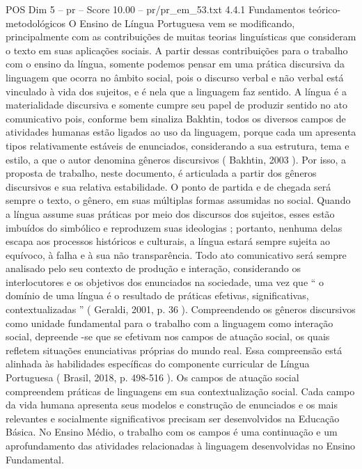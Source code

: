 \begin{textsample}{POS Dim 5 – pr – Score 10.00 – pr/pr\_em\_53.txt}  \label{ex:f5_pos_055}
4.4.1 Fundamentos teórico-metodológicos O Ensino de Língua Portuguesa vem se modificando, principalmente com as contribuições de muitas teorias linguísticas que consideram o texto em suas aplicações sociais.
A partir dessas contribuições para o trabalho com o ensino da língua, somente podemos pensar em uma prática discursiva da linguagem que ocorra no âmbito social, pois o discurso verbal e não verbal está vinculado à vida dos sujeitos, e é nela que a linguagem faz sentido.
A língua é a materialidade discursiva e somente cumpre seu papel de produzir sentido no ato comunicativo pois, conforme bem sinaliza Bakhtin, todos os diversos campos de atividades humanas estão ligados ao uso da linguagem, porque cada um apresenta tipos relativamente estáveis de enunciados, considerando a sua estrutura, tema e estilo, a que o autor denomina gêneros discursivos ( Bakhtin, 2003 ).
Por isso, a proposta de trabalho, neste documento, é articulada a partir dos gêneros discursivos e sua relativa estabilidade.
O ponto de partida e de chegada será sempre o texto, o gênero, em suas múltiplas formas assumidas no social.
Quando a língua assume suas práticas por meio dos discursos dos sujeitos, esses estão imbuídos do simbólico e reproduzem suas ideologias ; portanto, nenhuma delas escapa aos processos históricos e culturais, a língua estará sempre sujeita ao equívoco, à falha e à sua não transparência.
Todo ato comunicativo será sempre analisado pelo seu contexto de produção e interação, considerando os interlocutores e os objetivos dos enunciados na sociedade, uma vez que “ o domínio de uma língua é o resultado de práticas efetivas, significativas, contextualizadas ” ( Geraldi, 2001, p. 36 ).
Compreendendo os gêneros discursivos como unidade fundamental para o trabalho com a linguagem como interação social, depreende -se que se efetivam nos campos de atuação social, os quais refletem situações enunciativas próprias do mundo real.
Essa compreensão está alinhada às habilidades específicas do componente curricular de Língua Portuguesa ( Brasil, 2018, p. 498-516 ).
Os campos de atuação social compreendem práticas de linguagens em sua contextualização social.
Cada campo da vida humana apresenta seus modelos e construção de enunciados e os mais relevantes e socialmente significativos precisam ser desenvolvidos na Educação Básica.
No Ensino Médio, o trabalho com os campos é uma continuação e um aprofundamento das atividades relacionadas à linguagem desenvolvidas no Ensino Fundamental.

\end{textsample}
